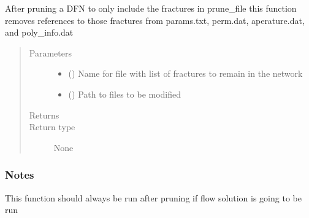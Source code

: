\documentclass[letterpaper,10pt,english]{sphinxmanual}
\begin{document}
\begin{fulllineitems}
\label{\detokenize{pydfnworks:pydfnworks.dfnGen.mesh_dfn_helper.clean_up_files_after_prune}}
After pruning a DFN to only include the fractures in prune\_file this function removes references to those fractures from params.txt, perm.dat, aperature.dat, and poly\_info.dat
\begin{quote}\begin{description}
\item[{Parameters}] \leavevmode\begin{itemize}
\item {} 
 () \textendash{} Name for file with list of fractures to remain in the network

\item {} 
 () \textendash{} Path to files to be modified

\end{itemize}

\item[{Returns}] \leavevmode


\item[{Return type}] \leavevmode
None

\end{description}\end{quote}
\subsubsection*{Notes}

This function should always be run after pruning if flow solution is going to be run

\end{fulllineitems}

\end{document}
